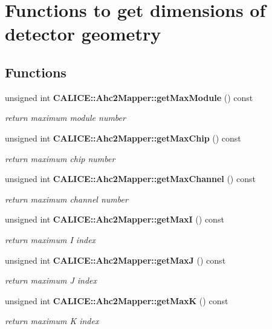 \section{Functions to get dimensions of detector geometry}
\label{group__Range}
\subsection*{Functions}
\begin{DoxyCompactItemize}
\item 
unsigned int {\bf CALICE::Ahc2Mapper::getMaxModule} () const 
\begin{DoxyCompactList}\small\item\em return maximum module number \item\end{DoxyCompactList}\item 
unsigned int {\bf CALICE::Ahc2Mapper::getMaxChip} () const 
\begin{DoxyCompactList}\small\item\em return maximum chip number \item\end{DoxyCompactList}\item 
unsigned int {\bf CALICE::Ahc2Mapper::getMaxChannel} () const 
\begin{DoxyCompactList}\small\item\em return maximum channel number \item\end{DoxyCompactList}\item 
unsigned int {\bf CALICE::Ahc2Mapper::getMaxI} () const 
\begin{DoxyCompactList}\small\item\em return maximum I index \item\end{DoxyCompactList}\item 
unsigned int {\bf CALICE::Ahc2Mapper::getMaxJ} () const 
\begin{DoxyCompactList}\small\item\em return maximum J index \item\end{DoxyCompactList}\item 
unsigned int {\bf CALICE::Ahc2Mapper::getMaxK} () const 
\begin{DoxyCompactList}\small\item\em return maximum K index \item\end{DoxyCompactList}\item 

\end{DoxyCompactItemize}
